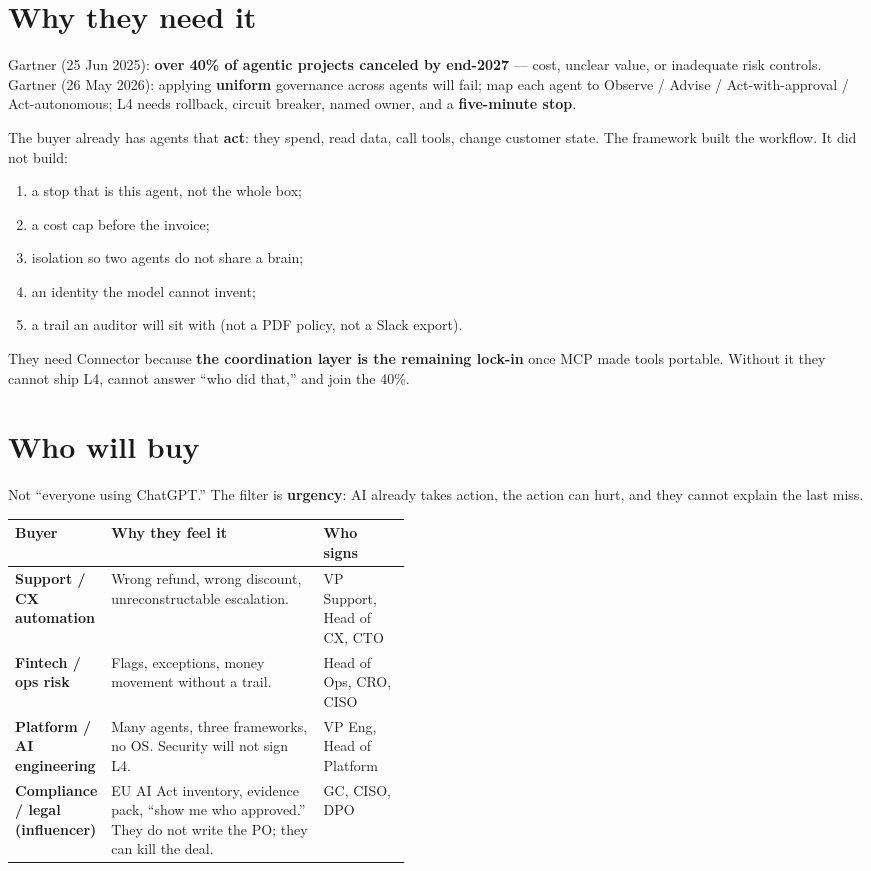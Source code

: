 \documentclass[10pt]{article}
\begin{document}
\section{Why they need it}

Gartner (25 Jun 2025): \textbf{over 40\% of agentic projects canceled by end-2027} --- cost, unclear value, or inadequate risk controls. Gartner (26 May 2026): applying \textbf{uniform} governance across agents will fail; map each agent to Observe / Advise / Act-with-approval / Act-autonomous; L4 needs rollback, circuit breaker, named owner, and a \textbf{five-minute stop}.

The buyer already has agents that \textbf{act}: they spend, read data, call tools, change customer state. The framework built the workflow. It did not build:

\begin{enumerate}
  \item a stop that is this agent, not the whole box;
  \item a cost cap before the invoice;
  \item isolation so two agents do not share a brain;
  \item an identity the model cannot invent;
  \item a trail an auditor will sit with (not a PDF policy, not a Slack export).
\end{enumerate}

They need Connector because \textbf{the coordination layer is the remaining lock-in} once MCP made tools portable. Without it they cannot ship L4, cannot answer ``who did that,'' and join the 40\%.

\section{Who will buy}

Not ``everyone using ChatGPT.'' The filter is \textbf{urgency}: AI already takes action, the action can hurt, and they cannot explain the last miss.

\renewcommand{\arraystretch}{1.08}
{\small
\begin{tabularx}{\linewidth}{@{}>{\bfseries\arraybackslash}p{0.24\linewidth} X >{\raggedright\arraybackslash}p{0.22\linewidth}@{}}
\toprule
Buyer & Why they feel it & Who signs \\
\midrule
Support / CX automation & Wrong refund, wrong discount, unreconstructable escalation. & VP Support, Head of CX, CTO \\
Fintech / ops risk & Flags, exceptions, money movement without a trail. & Head of Ops, CRO, CISO \\
Platform / AI engineering & Many agents, three frameworks, no OS. Security will not sign L4. & VP Eng, Head of Platform \\
Compliance / legal (influencer) & EU AI Act inventory, evidence pack, ``show me who approved.'' They do not write the PO; they can kill the deal. & GC, CISO, DPO \\
\bottomrule
\end{tabularx}
}
\end{document}
